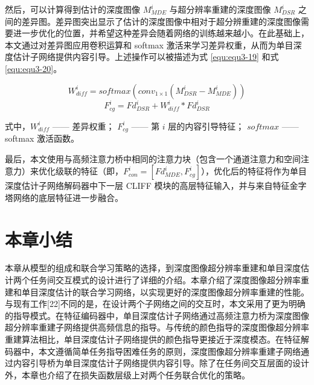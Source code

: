然后，可以计算得到估计的深度图像 $M_{MDE}^i$ 与超分辨率重建的深度图像 $M_{DSR}^i$ 之间的差异图。差异图突出显示了估计的深度图像中相对于超分辨重建的深度图像需要进一步优化的位置，并希望这种差异会随着网络的训练越来越小。在此基础上，本文通过对差异图应用卷积运算和 softmax 激活来学习差异权重，从而为单目深度估计子网络提供内容引导。上述操作可以被描述为式 \ref{equ:equ3-19} 和式 \ref{equ:equ3-20}。

\vspace{-0.4cm}
\begin{equation}
	W_{diff}^i=softmax\left(conv_{1\times1}\left(M_{DSR}^i-M_{MDE}^i\right)\right)
		\label{equ:equ3-19}
\end{equation}
\vspace{-0.8cm}
\begin{equation}
	F_{cg}^i=Fd_{DSR}^i+W_{diff}^i\ast Fd_{DSR}^i
	\label{equ:equ3-20}
\end{equation}

\noindent 式中，$W_{diff}^i$ —— 差异权重；\newline
\indent\quad $F_{cg}^i$ —— 第 $i$ 层的内容引导特征；\newline
\indent\quad $softmax$ —— softmax 激活函数。

最后，本文使用与高频注意力桥中相同的注意力块（包含一个通道注意力和空间注意力）来优化级联的特征（即，$F_{con}^i=\left[Fd_{MDE}^i,F_{cg}^i\right]$），优化后的特征将作为单目深度估计子网络解码器中下一层 CLIFF 模块的高层特征输入，并与来自特征金字塔网络的底层特征进一步融合。

\section{本章小结}

本章从模型的组成和联合学习策略的选择，到深度图像超分辨率重建和单目深度估计两个任务间交互模式的设计进行了详细的介绍。本章介绍了深度图像超分辨率重建和单目深度估计的联合学习网络，以实现更好的深度图像超分辨率重建的性能。与现有工作[22]不同的是，在设计两个子网络之间的交互时，本文采用了更为明确的指导模式。在特征编码器中，单目深度估计子网络通过高频注意力桥为深度图像超分辨率重建子网络提供高频信息的指导。与传统的颜色指导的深度图像超分辨率重建算法相比，单目深度估计子网络提供的颜色指导更接近于深度模态。在特征解码器中，本文遵循简单任务指导困难任务的原则，深度图像超分辨率重建子网络通过内容引导桥为单目深度估计子网络提供内容引导。除了在任务间交互层面的设计外，本章也介绍了在损失函数层级上对两个任务联合优化的策略。

